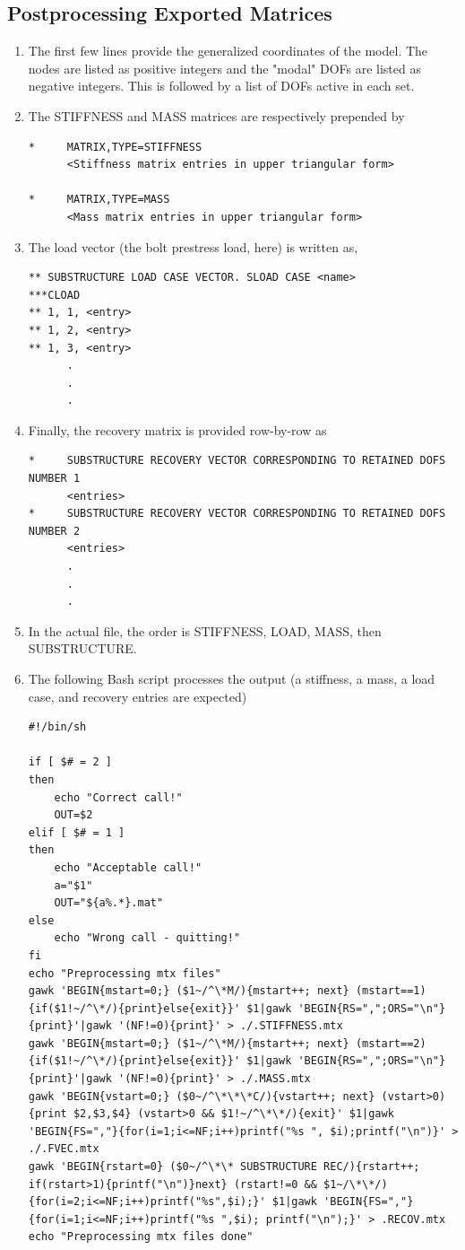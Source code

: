 \documentclass[11pt]{article}
\begin{document}
\subsection{Postprocessing Exported Matrices}
\label{sec:orge583c67}
\begin{enumerate}
\item The first few lines provide the generalized coordinates of the model. The nodes are listed as positive integers and the "modal" DOFs are listed as negative integers.
This is followed by a list of DOFs active in each set.
\item The STIFFNESS and MASS matrices are respectively prepended by
\begin{verbatim}
*     MATRIX,TYPE=STIFFNESS
      <Stiffness matrix entries in upper triangular form>

*     MATRIX,TYPE=MASS
      <Mass matrix entries in upper triangular form>      
\end{verbatim}
\item The load vector (the bolt prestress load, here) is written as,
\begin{verbatim}
** SUBSTRUCTURE LOAD CASE VECTOR. SLOAD CASE <name>
***CLOAD 
** 1, 1, <entry>
** 1, 2, <entry>
** 1, 3, <entry>
      .
      .
      .
\end{verbatim}
\item Finally, the recovery matrix is provided row-by-row as
\begin{verbatim}
*     SUBSTRUCTURE RECOVERY VECTOR CORRESPONDING TO RETAINED DOFS NUMBER 1
      <entries>
*     SUBSTRUCTURE RECOVERY VECTOR CORRESPONDING TO RETAINED DOFS NUMBER 2
      <entries>
      .
      .
      .
\end{verbatim}
\item In the actual file, the order is STIFFNESS, LOAD, MASS, then SUBSTRUCTURE.
\item The following Bash script processes the output (a stiffness, a mass, a load case, and recovery entries are expected)
\begin{verbatim}
#!/bin/sh

if [ $# = 2 ]
then 
    echo "Correct call!"
    OUT=$2
elif [ $# = 1 ]
then
    echo "Acceptable call!"
    a="$1"
    OUT="${a%.*}.mat"
else
    echo "Wrong call - quitting!"
fi
echo "Preprocessing mtx files"
gawk 'BEGIN{mstart=0;} ($1~/^\*M/){mstart++; next} (mstart==1){if($1!~/^\*/){print}else{exit}}' $1|gawk 'BEGIN{RS=",";ORS="\n"}{print}'|gawk '(NF!=0){print}' > ./.STIFFNESS.mtx
gawk 'BEGIN{mstart=0;} ($1~/^\*M/){mstart++; next} (mstart==2){if($1!~/^\*/){print}else{exit}}' $1|gawk 'BEGIN{RS=",";ORS="\n"}{print}'|gawk '(NF!=0){print}' > ./.MASS.mtx
gawk 'BEGIN{vstart=0;} ($0~/^\*\*\*C/){vstart++; next} (vstart>0){print $2,$3,$4} (vstart>0 && $1!~/^\*\*/){exit}' $1|gawk 'BEGIN{FS=","}{for(i=1;i<=NF;i++)printf("%s ", $i);printf("\n")}' > ./.FVEC.mtx
gawk 'BEGIN{rstart=0} ($0~/^\*\* SUBSTRUCTURE REC/){rstart++; if(rstart>1){printf("\n")}next} (rstart!=0 && $1~/\*\*/){for(i=2;i<=NF;i++)printf("%s",$i);}' $1|gawk 'BEGIN{FS=","}{for(i=1;i<=NF;i++)printf("%s ",$i); printf("\n");}' > .RECOV.mtx
echo "Preprocessing mtx files done"


\end{verbatim}
\end{enumerate}
\end{document}
